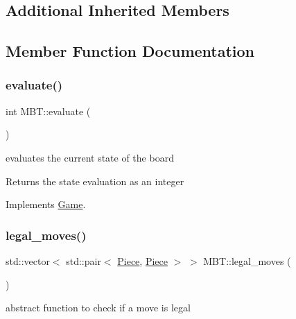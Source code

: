 \subsection*{Additional Inherited Members}


\subsection{Member Function Documentation}
\mbox{\label{class_m_b_t_a62bfe73fc6dd6da20650f27024dd0115}} 
\subsubsection{\texorpdfstring{evaluate()}{evaluate()}}
{\footnotesize\ttfamily int M\+B\+T\+::evaluate (\begin{DoxyParamCaption}{ }\end{DoxyParamCaption})\hspace{0.3cm}{\ttfamily [virtual]}}



evaluates the current state of the board 

\begin{DoxyReturn}{Returns}
the state evaluation as an integer 
\end{DoxyReturn}


Implements \hyperlink{class_game_a068b2b3012154457f362c90a80f46253}{Game}.

\mbox{\label{class_m_b_t_add9f32f140d4c6fb5e160eadeddd6738}} 
\subsubsection{\texorpdfstring{legal\+\_\+moves()}{legal\_moves()}}
{\footnotesize\ttfamily std\+::vector$<$ std\+::pair$<$ \hyperlink{class_piece}{Piece}, \hyperlink{class_piece}{Piece} $>$ $>$ M\+B\+T\+::legal\+\_\+moves (\begin{DoxyParamCaption}{ }\end{DoxyParamCaption})\hspace{0.3cm}{\ttfamily [virtual]}}



abstract function to check if a move is legal 


